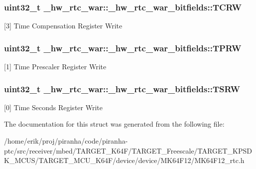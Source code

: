 \subsubsection[{\texorpdfstring{T\+C\+RW}{TCRW}}]{\setlength{\rightskip}{0pt plus 5cm}uint32\+\_\+t \+\_\+hw\+\_\+rtc\+\_\+war\+::\+\_\+hw\+\_\+rtc\+\_\+war\+\_\+bitfields\+::\+T\+C\+RW}\hypertarget{struct__hw__rtc__war_1_1__hw__rtc__war__bitfields_a990f4597273cf515d0b4f8ab45fdf883}{}\label{struct__hw__rtc__war_1_1__hw__rtc__war__bitfields_a990f4597273cf515d0b4f8ab45fdf883}
\mbox{[}3\mbox{]} Time Compensation Register Write 
\subsubsection[{\texorpdfstring{T\+P\+RW}{TPRW}}]{\setlength{\rightskip}{0pt plus 5cm}uint32\+\_\+t \+\_\+hw\+\_\+rtc\+\_\+war\+::\+\_\+hw\+\_\+rtc\+\_\+war\+\_\+bitfields\+::\+T\+P\+RW}\hypertarget{struct__hw__rtc__war_1_1__hw__rtc__war__bitfields_aa52206fd19983ddfd5424b6903eee25b}{}\label{struct__hw__rtc__war_1_1__hw__rtc__war__bitfields_aa52206fd19983ddfd5424b6903eee25b}
\mbox{[}1\mbox{]} Time Prescaler Register Write 
\subsubsection[{\texorpdfstring{T\+S\+RW}{TSRW}}]{\setlength{\rightskip}{0pt plus 5cm}uint32\+\_\+t \+\_\+hw\+\_\+rtc\+\_\+war\+::\+\_\+hw\+\_\+rtc\+\_\+war\+\_\+bitfields\+::\+T\+S\+RW}\hypertarget{struct__hw__rtc__war_1_1__hw__rtc__war__bitfields_a0293740840b805ba1879082516b53322}{}\label{struct__hw__rtc__war_1_1__hw__rtc__war__bitfields_a0293740840b805ba1879082516b53322}
\mbox{[}0\mbox{]} Time Seconds Register Write 

The documentation for this struct was generated from the following file\+:\begin{DoxyCompactItemize}
\item 
/home/erik/proj/piranha/code/piranha-\/ptc/src/receiver/mbed/\+T\+A\+R\+G\+E\+T\+\_\+\+K64\+F/\+T\+A\+R\+G\+E\+T\+\_\+\+Freescale/\+T\+A\+R\+G\+E\+T\+\_\+\+K\+P\+S\+D\+K\+\_\+\+M\+C\+U\+S/\+T\+A\+R\+G\+E\+T\+\_\+\+M\+C\+U\+\_\+\+K64\+F/device/device/\+M\+K64\+F12/M\+K64\+F12\+\_\+rtc.\+h\end{DoxyCompactItemize}
